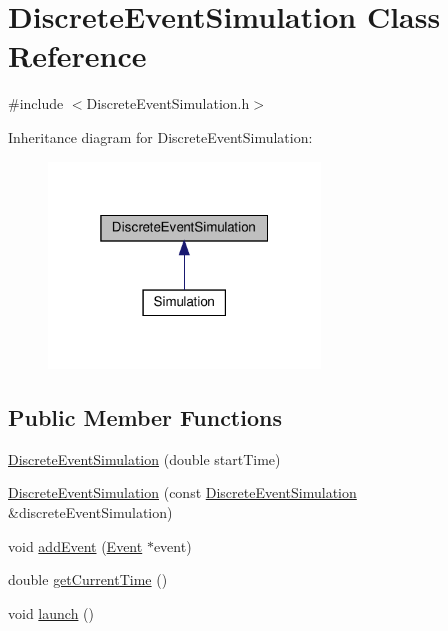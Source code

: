 \hypertarget{classDiscreteEventSimulation}{}\section{Discrete\+Event\+Simulation Class Reference}
\label{classDiscreteEventSimulation}


{\ttfamily \#include $<$Discrete\+Event\+Simulation.\+h$>$}



Inheritance diagram for Discrete\+Event\+Simulation\+:\nopagebreak
\begin{figure}[H]
\begin{center}
\leavevmode
\includegraphics[width=205pt]{classDiscreteEventSimulation__inherit__graph}
\end{center}
\end{figure}
\subsection*{Public Member Functions}
\begin{DoxyCompactItemize}
\item 
\hyperlink{classDiscreteEventSimulation_afef7ef964c3a7d151150120184c58d99}{Discrete\+Event\+Simulation} (double start\+Time)
\item 
\hyperlink{classDiscreteEventSimulation_aa92e10279fe95449f35139a4893192f5}{Discrete\+Event\+Simulation} (const \hyperlink{classDiscreteEventSimulation}{Discrete\+Event\+Simulation} \&discrete\+Event\+Simulation)
\item 
void \hyperlink{classDiscreteEventSimulation_a03770d2464931bc3555d4f34379aaa1e}{add\+Event} (\hyperlink{classEvent}{Event} $\ast$event)
\item 
double \hyperlink{classDiscreteEventSimulation_a41c5492fdf2d5ef2a9a27200871caabd}{get\+Current\+Time} ()
\item 
void \hyperlink{classDiscreteEventSimulation_aae616e227950798dc958171210975713}{launch} ()
\end{DoxyCompactItemize}


